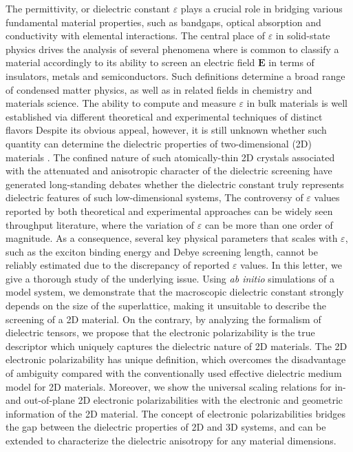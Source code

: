 The permittivity, or dielectric constant $\varepsilon$ plays a crucial
role in bridging various fundamental material properties, such as
bandgaps\cite{Moss_1950_relation,Moss_1985_n_Eg}, optical
absorption\cite{Kittel_2005_introduction_book} and
conductivity\cite{Dressel_2001_electrodynamics} with elemental
interactions.  The central place of $\varepsilon$ in solid-state
physics drives the analysis of several phenomena where is common to
classify a material accordingly to its ability to screen an electric
field $\boldsymbol{E}$ in terms of insulators, metals and
semiconductors. Such definitions determine a broad range of condensed
matter physics, as well as in related fields in chemistry and
materials science.  The ability to compute and measure $\varepsilon$
in bulk materials is well established via different theoretical
\cite{Adler_1962_eps,Hybertsen_1987} and experimental techniques
\cite{Palik_1998_handbook} of distinct flavors
%
Despite its obvious appeal, however, it is still unknown whether such quantity can determine the 
dielectric properties of two-dimensional (2D) materials \cite{Novoselov_2016_vdW}.  
%
The confined nature of such atomically-thin 2D crystals associated
with the attenuated and anisotropic character of the dielectric
screening
\cite{Keldysh_1979_eps_multi,Sharma_1985_semiconductor_slab_eps,Low_2014_screening_BP,Cudazzo_2011_screening_2D,Bechstedt_2012_silicene,Cudazzo_2010_screen2D,Nazarov_2015_2D_3D}
have generated long-standing debates whether the dielectric constant
truly represents dielectric features of such low-dimensional systems,
The controversy of $\varepsilon$ values reported by both theoretical
and experimental approaches can be widely seen throughput
literature\cite{Li_2016_screening_rev}, where the variation of
$\varepsilon$ can be more than one order of magnitude.
%
As a
consequence, several key physical parameters that scales with
$\varepsilon$, such as the exciton binding energy and Debye screening
length, cannot be reliably estimated due to the discrepancy of
reported $\varepsilon$ values. In this letter, we give a thorough
study of the underlying issue. Using \textit{ab initio} simulations of
a model system, we demonstrate that the macroscopic dielectric
constant strongly depends on the size of the superlattice, making it
unsuitable to describe the screening of a 2D material. On the
contrary, by analyzing the formalism of dielectric tensors, we propose
that the electronic polarizability is the true descriptor which
uniquely captures the dielectric nature of 2D materials. The 2D
electronic polarizability has unique definition, which overcomes the
disadvantage of ambiguity compared with the conventionally used
effective dielectric medium model for 2D materials. Moreover, we show
the universal scaling relations for in- and out-of-plane 2D electronic
polarizabilities with the electronic and geometric information of the
2D material. The concept of electronic polarizabilities bridges the
gap between the dielectric properties of 2D and 3D systems, and can be
extended to characterize the dielectric anisotropy for any material
dimensions.


